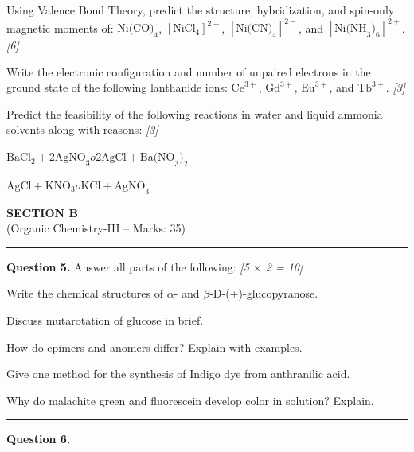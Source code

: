 \documentclass[11pt,a4paper]{article}
\newcommand{\pts}[1]{\hfill   \textit{[#1]}}
\begin{document}
\begin{parts}
  \item Using Valence Bond Theory, predict the structure, hybridization, and spin-only magnetic moments of: $ \text{Ni(CO)}_4$, $[ \text{NiCl}_4]^{2-}$, $[ \text{Ni(CN)}_4]^{2-}$, and $[ \text{Ni(NH}_3)_6]^{2+}$. \pts{6}
  \item Write the electronic configuration and number of unpaired electrons in the ground state of the following lanthanide ions: $ \text{Ce}^{3+}$, $ \text{Gd}^{3+}$, $ \text{Eu}^{3+}$, and $ \text{Tb}^{3+}$. \pts{3}
  \item Predict the feasibility of the following reactions in water and liquid ammonia solvents along with reasons: \pts{3}
  
\begin{parts}
    \item $ \text{BaCl}_2 + 2 \text{AgNO}_3  o 2 \text{AgCl} +  \text{Ba(NO}_3)_2$
    \item $ \text{AgCl} +  \text{KNO}_3  o  \text{KCl} +  \text{AgNO}_3$
  \end{parts}
\end{parts}


\newpage

\begin{center}
  {\large\bfseries SECTION B}\\[2pt]
  {\normalsize (Organic Chemistry-III -- Marks: 35)}
\end{center}
\rule{0.4\linewidth}{0.2pt}
\smallskip




\noindent   \textbf{Question 5.} Answer all parts of the following: \pts{5 $ \times$ 2 = 10}

\begin{parts}
  \item Write the chemical structures of $\alpha$- and $\beta$-D-(+)-glucopyranose.
  \item Discuss mutarotation of glucose in brief.
  \item How do epimers and anomers differ? Explain with examples.
  \item Give one method for the synthesis of Indigo dye from anthranilic acid.
  \item Why do malachite green and fluorescein develop color in solution? Explain.
\end{parts}

\medskip\rule{\linewidth}{0.2pt}




\noindent   \textbf{Question 6.}
\end{document}
